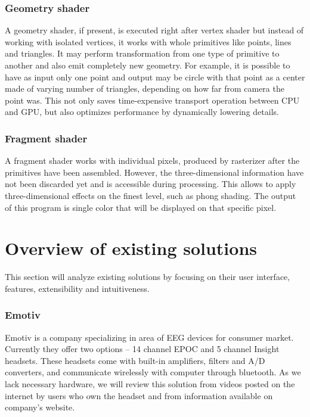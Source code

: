 \subsection{Geometry shader}
A geometry shader, if present, is executed right after vertex shader but instead
of working with isolated vertices, it works with whole primitives like points,
lines and triangles. It may perform transformation from one type of primitive to
another and also emit completely new geometry. For example, it is possible to
have as input only one point and output may be circle with that point as a
center made of varying number of triangles, depending on how far from camera
the point was. This not only saves time-expensive transport operation between
CPU and GPU, but also optimizes performance by dynamically lowering details.

\subsection{Fragment shader}
A fragment shader works with individual pixels, produced by rasterizer after the
primitives have been assembled. However, the three-dimensional information have
not been discarded yet and is accessible during processing. This allows to apply
three-dimensional effects on the finest level, such as phong shading. The output
of this program is single color that will be displayed on that specific pixel.

\chapter{Overview of existing solutions}
\label{existSol}
This section will analyze existing solutions by focusing on their user interface, features, extensibility and intuitiveness.

\subsection{Emotiv}
Emotiv is a company specializing in area of EEG devices for consumer market.
Currently they offer two options -- 14 channel EPOC and 5 channel Insight
headsets. These headsets come with built-in amplifiers, filters and A/D
converters, and communicate wirelessly with computer through bluetooth. As
we lack necessary hardware, we will review this solution from videos posted on
the internet by users who own the headset and from information available on
company's website.

